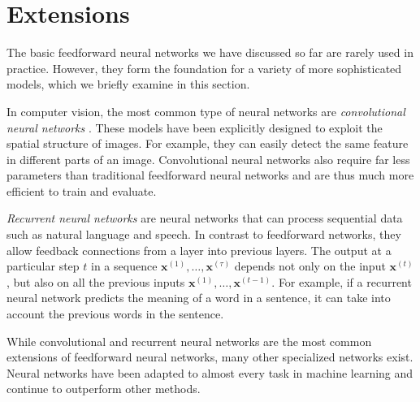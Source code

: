 \section{Extensions}
\label{sec:extensions}
The basic feedforward neural networks we have discussed so far are rarely used in practice. However, they form the foundation for a variety of more sophisticated models, which we briefly examine in this section.

In computer vision, the most common type of neural networks are \emph{convolutional neural networks} \cite{LeCun1989}. These models have been explicitly designed to exploit the spatial structure of images. For example, they can easily detect the same feature in different parts of an image. Convolutional neural networks also require far less parameters than traditional feedforward neural networks and are thus much more efficient to train and evaluate.

\emph{Recurrent neural networks} \cite{Rumelhart1986533} are neural networks that can process sequential data such as natural language and speech. In contrast to feedforward networks, they allow feedback connections from a layer into previous layers. The output at a particular step $t$ in a sequence $\bm{x}^{(1)}, \ldots, \bm{x}^{(\tau)}$ depends not only on the input $\bm{x}^{(t)}$, but also on all the previous inputs $\bm{x}^{(1)}, \ldots, \bm{x}^{(t-1)}$. For example, if a recurrent neural network predicts the meaning of a word in a sentence, it can take into account the previous words in the sentence.

While convolutional and recurrent neural networks are the most common extensions of feedforward neural networks, many other specialized networks exist. Neural networks have been adapted to almost every task in machine learning and continue to outperform other methods.